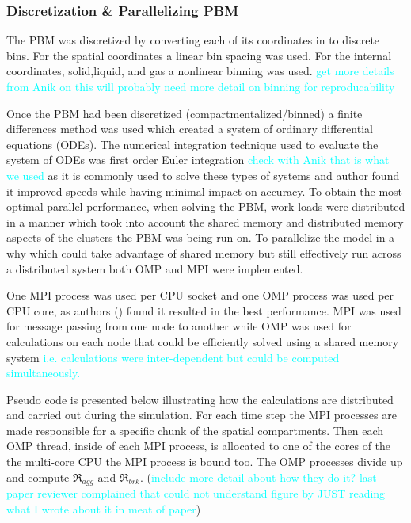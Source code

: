 \documentclass[preprint,11pt,authoryear]{elsarticle}
\begin{document}
	    \subsubsection{Discretization \& Parallelizing PBM}
	    \par The PBM was discretized by converting each of its coordinates in to discrete bins. For the spatial coordinates a linear bin spacing was used. For the internal coordinates, solid,liquid, and gas a nonlinear binning was used. \textcolor{cyan}{get more details from Anik on this will probably need more detail on binning for reproducability}
	    \par Once the PBM had been discretized (compartmentalized/binned) a finite differences method was used which created a system of ordinary differential equations (ODEs). The numerical integration technique used to evaluate the system of ODEs was first order Euler integration \textcolor{cyan}{check with Anik that is what we used} as it is commonly used to solve these types of systems and author  found it improved speeds while having minimal impact on accuracy. To obtain the most optimal parallel performance, when solving the PBM, work loads were distributed in a manner which took into account the shared memory and distributed memory aspects of the clusters the PBM was being run on. To parallelize the model in a why which could take advantage of shared memory but still effectively run across a distributed system both OMP and MPI were implemented. 
	    \par One MPI process was used per CPU socket and one OMP process was used per CPU core, as authors (\cite{Bettencourt2017}) found it resulted in the best performance. MPI was used for message passing from one node to another while OMP was used for calculations on each node that could be efficiently solved using a shared memory system \textcolor{cyan}{i.e. calculations were inter-dependent but could be computed simultaneously.} 
	    \par Pseudo code is presented below illustrating how the calculations are distributed and carried out during the simulation. For each time step the MPI processes are made responsible for a specific chunk of the spatial compartments. Then each OMP thread, inside of each MPI process, is allocated to one of the cores of the the multi-core CPU the MPI process is bound too. The OMP processes divide up and compute $\Re_{agg}$ and $\Re_{brk}$. (\textcolor{cyan}{include more detail about how they do it? last paper reviewer complained that could not understand figure by JUST reading what I wrote about it in meat of paper}) 
\end{document}
